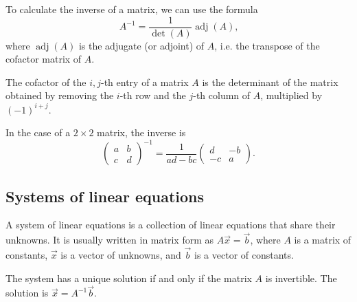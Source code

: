 To calculate the inverse of a matrix, we can use the formula
\[
  A^{-1} = \frac{1}{\det(A)} \operatorname{adj}(A)\text{,}
\]
where $\operatorname{adj}(A)$ is the adjugate (or adjoint) of $A$, i.e. the transpose of the cofactor matrix
of $A$.

The cofactor of the $i, j$-th entry of a matrix $A$ is the determinant of the matrix
obtained by removing the $i$-th row and the $j$-th column of $A$, multiplied by $(-1)^{i
+ j}$.

In the case of a $2 \times 2$ matrix, the inverse is
\[
  \begin{pmatrix}
    a & b \\
    c & d
  \end{pmatrix}^{-1} = \frac{1}{ad - bc}
  \begin{pmatrix}
    d & -b \\
    -c & a
  \end{pmatrix}\text{.}
\]

\subsection{Systems of linear equations}

A system of linear equations is a collection of linear equations that share their
unknowns.  It is usually written in matrix form as $A \vec{x} = \vec{b}$, where $A$ is a
matrix of constants, $\vec{x}$ is a vector of unknowns, and $\vec{b}$ is a vector of
constants.

The system has a unique solution if and only if the matrix $A$ is invertible.  The
solution is $\vec{x} = A^{-1} \vec{b}$.

